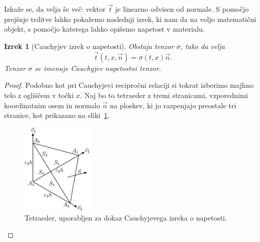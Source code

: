 \documentclass[12pt,a4paper,twoside]{article}
\theoremstyle{definition} %
\theoremstyle{plain} %
\newtheorem{izrek}[definicija]{Izrek}
\numberwithin{equation}{section}
\newcommand{\vt}{\vec{t}}
\newcommand{\vn}{\vec{n}}
\newcommand{\vx}{x}
\newcommand{\ts}{\sigma}
\begin{document}
Izkaže se, da velja še več: vektor $\vt$ je linearno odvisen od normale. S
pomočjo prejšnje trditve lahko pokažemo naslednji izrek, ki nam da na voljo
matematični objekt, s pomočjo katerega lahko opišemo napetost v materialu.
\begin{izrek}[Cauchyjev izrek o napetosti]
  Obstaja tenzor $\ts$, tako da velja \[
    \vt(t, \vx, \vn) = \ts(t, \vx)\vn.
  \]
  Tenzor $\ts$ se imenuje Cauchyjev napetostni tenzor.
\end{izrek}
\begin{proof}
Podobno kot pri Cauchyjevi recipročni relaciji si tokrat izberimo majhno telo z ogliščem v točki
$\vx$. Naj bo to tetraeder z tremi stranicami, vzporednimi koordinatnim osem in normalo $\vn$ na
ploskev, ki jo razpenjajo preostale tri stranice, kot prikazano na sliki~\ref{fig:tetra}.

\begin{figure}[h]
  \centering
  \includegraphics[width=0.3\textwidth]{images/cauchy_tetrahedron.pdf}
  \caption{Tetraeder, uporabljen za dokaz Cauchyjevega izreka o napetosti.}
  \label{fig:tetra}
\end{figure}


\end{proof}
\end{document}
